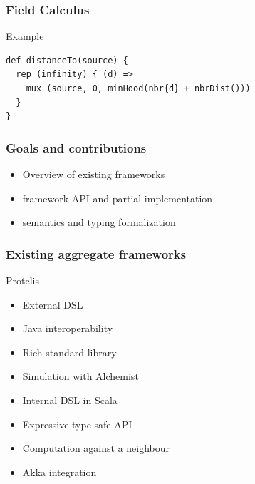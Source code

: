 \begin{frame}[fragile]
\frametitle{Field Calculus}
	\begin{block}{Example}
\begin{lstlisting}[]
def distanceTo(source) {
  rep (infinity) { (d) =>
    mux (source, 0, minHood(nbr{d} + nbrDist()))
  }
}
\end{lstlisting}
\end{block}
\end{frame}

\begin{frame}
\frametitle{Goals and contributions}
\begin{block}{}
\begin{itemize}
\item Overview of existing frameworks
\item \Kotac{} framework API and partial implementation
\item \FKotac{} semantics and typing formalization
\end{itemize}
\end{block}
\end{frame}

\begin{frame}
\frametitle{Existing aggregate frameworks}
\begin{block}{Protelis}
\begin{itemize}
\item External DSL
\item Java interoperability
\item Rich standard library
\item Simulation with Alchemist
\end{itemize}
\end{block}
\begin{block}{\Scafi}
\begin{itemize}
\item Internal DSL in Scala
\item Expressive type-safe API
\item Computation against a neighbour
\item Akka integration
\end{itemize}
\end{block}
\end{frame}

